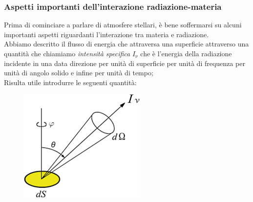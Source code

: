 \documentclass[a4paper,11pt]{article}
\begin{document}
\subsubsection{Aspetti importanti dell'interazione radiazione-materia}
Prima di cominciare a parlare di atmosfere stellari, è bene soffermarsi su alcuni importanti aspetti riguardanti l'interazione tra materia e radiazione. \\ Abbiamo descritto il flusso di energia che attraversa una superficie attraverso una quantità che chiamiamo \textit{intensità specifica} \textit{${I_\nu}$} che è l'energia della radiazione incidente in una data direzione per unità di superficie per unità di frequenza per unità di angolo solido e infine per unità di tempo; \\ Risulta utile introdurre le seguenti quantità: 
\begin{figure}[h]
    \centering
    \includegraphics{cono radiazione.png}
\end{figure}
\end{document}

